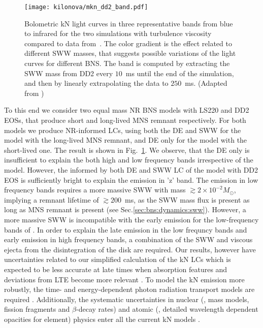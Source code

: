 \begin{figure}[t]
    \centering
    \texttt{[image: kilonova/mkn\_dd2\_band.pdf]}
    \caption{Bolometric kN light curves in three representative bands from blue to
        infrared for the two simulations with turbulence viscosity compared to
        \AT{} data from~\citep{Villar:2017wcc}.
        The color gradient is the effect related to different
        \ac{SWW} masses, that suggests possible variations of the light
        curves for different \ac{BNS}. The band is computed by extracting the
        \ac{SWW} mass from DD2 every $10$~ms until the end of the simulation, and
        then by linearly extrapolating the data to $250$~ms.
        (Adapted from \citet{Nedora:2019jhl})
    }
    \label{fig:knlc}
\end{figure}

To this end we consider two equal mass \ac{NR} \ac{BNS} models with LS220 and DD2 \acp{EOS}, that produce short and long-lived \ac{MNS} remnant respectively. 
For both models we produce \ac{NR}-informed \acp{LC}, using both the \ac{DE} and \ac{SWW} for the model with the long-lived \ac{MNS} remnant, and \ac{DE} only for the model with the short-lived one.
The result is shown in Fig.~\ref{fig:knlc}.
We observe, that the \ac{DE} only is insufficient to explain the \AT{} both high and low frequency bands irrespective of the model. However, the informed by both \ac{DE} and \ac{SWW} \ac{LC} of the model with DD2 \ac{EOS} is sufficiently bright to explain the emission in 'z' band. 
The emission in low frequency bands requires a more massive 
\ac{SWW} with mass ${\gtrsim} 2\times10^{-2}M_{\odot}$, implying a remnant lifetime of ${\gtrsim}200$~ms, as the \ac{SWW} mass flux is present as long 
as \ac{MNS} remnant is present (see Sec.\ref{sec:bns:dynamics:sww}).
However, a more massive \ac{SWW} is incompatible with
the early emission for the low-frequency bands of \AT{}.
In order to explain the late emission in the low frequncy bands and 
early emission in high frequency bands, a combination of the \ac{SWW} and 
viscous ejecta from the disintegration of the disk are required.
Our results, however have uncertainties related to our simplified calculation of
the \ac{kN} \acp{LC} which is expected to be less accurate at
late times when absorption features and deviations from \ac{LTE} become more relevant \citep[see \eg][]{Smartt:2017fuw}.
To model the \ac{kN} emission more robustly, the time- and energy-dependent 
photon radiation transport models are required 
\citep{Kasen:2017sxr,Tanaka:2017qxj,Miller:2019dpt,Bulla:2019muo}.
Additionally, the systematic uncertainties in
nuclear (\eg, mass models, fission fragments and $\beta$-decay
rates) and atomic (\eg, detailed wavelength dependent opacities for
\rproc{} element) physics enter all the current \ac{kN} models 
\citep{Eichler:2014kma,Rosswog:2016dhy,Gaigalas:2019ptx}.

